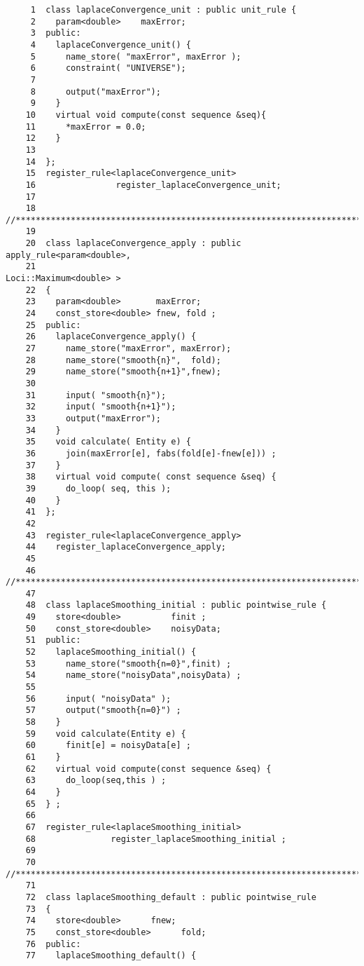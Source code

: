 \begin{verbatim}
     1  class laplaceConvergence_unit : public unit_rule {
     2    param<double>    maxError;
     3  public:
     4    laplaceConvergence_unit() {
     5      name_store( "maxError", maxError );
     6      constraint( "UNIVERSE");
     7
     8      output("maxError");
     9    }
    10    virtual void compute(const sequence &seq){
    11      *maxError = 0.0;
    12    }
    13
    14  };
    15  register_rule<laplaceConvergence_unit>
    16                register_laplaceConvergence_unit;
    17
    18  //*********************************************************************
    19
    20  class laplaceConvergence_apply : public apply_rule<param<double>,
    21                                                 Loci::Maximum<double> >
    22  {
    23    param<double>       maxError;
    24    const_store<double> fnew, fold ;
    25  public:
    26    laplaceConvergence_apply() {
    27      name_store("maxError", maxError);
    28      name_store("smooth{n}",  fold);
    29      name_store("smooth{n+1}",fnew);
    30
    31      input( "smooth{n}");
    32      input( "smooth{n+1}");
    33      output("maxError");
    34    }
    35    void calculate( Entity e) {
    36      join(maxError[e], fabs(fold[e]-fnew[e])) ;
    37    }
    38    virtual void compute( const sequence &seq) {
    39      do_loop( seq, this );
    40    }
    41  };
    42
    43  register_rule<laplaceConvergence_apply>
    44    register_laplaceConvergence_apply;
    45
    46  //*********************************************************************
    47
    48  class laplaceSmoothing_initial : public pointwise_rule {
    49    store<double>          finit ;
    50    const_store<double>    noisyData;
    51  public:
    52    laplaceSmoothing_initial() {
    53      name_store("smooth{n=0}",finit) ;
    54      name_store("noisyData",noisyData) ;
    55
    56      input( "noisyData" );
    57      output("smooth{n=0}") ;
    58    }
    59    void calculate(Entity e) {
    60      finit[e] = noisyData[e] ;
    61    }
    62    virtual void compute(const sequence &seq) {
    63      do_loop(seq,this ) ;
    64    }
    65  } ;
    66
    67  register_rule<laplaceSmoothing_initial>
    68               register_laplaceSmoothing_initial ;
    69
    70  //*********************************************************************
    71
    72  class laplaceSmoothing_default : public pointwise_rule
    73  {
    74    store<double>      fnew;
    75    const_store<double>      fold;
    76  public:
    77    laplaceSmoothing_default() {

\end{verbatim}
